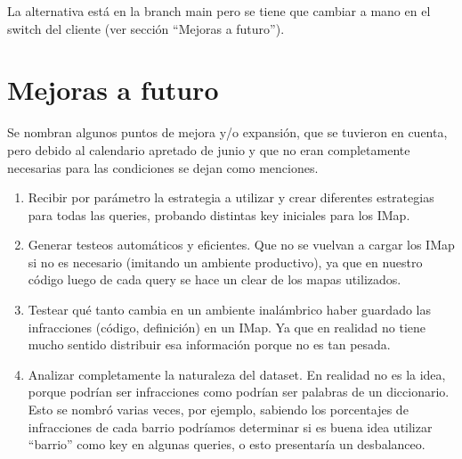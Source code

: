 \documentclass[a4paper,12pt]{article}
\begin{document}
	\bigskip
	
	La alternativa está en la branch main pero se tiene que cambiar a mano en el switch del cliente (ver sección ``Mejoras a futuro'').
	
	\newpage
	
	\section{Mejoras a futuro}
	
	Se nombran algunos puntos de mejora y/o expansión, que se tuvieron en cuenta, pero debido al calendario apretado de junio y que no eran completamente necesarias para las condiciones se dejan como menciones.
	
	\begin{enumerate}
		\item Recibir por parámetro la estrategia a utilizar y crear diferentes estrategias para todas las queries, probando distintas key iniciales para los IMap.
		\item Generar testeos automáticos y eficientes. Que no se vuelvan a cargar los IMap si no es necesario (imitando un ambiente productivo), ya que en nuestro código luego de cada query se hace un clear de los mapas utilizados.
		\item Testear qué tanto cambia en un ambiente inalámbrico haber guardado las infracciones (código, definición) en un IMap. Ya que en realidad no tiene mucho sentido distribuir esa información porque no es tan pesada.
		\item Analizar completamente la naturaleza del dataset. En realidad no es la idea, porque podrían ser infracciones como podrían ser palabras de un diccionario. Esto se nombró varias veces, por ejemplo, sabiendo los porcentajes de infracciones de cada barrio podríamos determinar si es buena idea utilizar ``barrio'' como key en algunas queries, o esto presentaría un desbalanceo.
	\end{enumerate}
\end{document}
